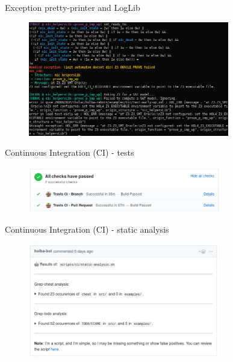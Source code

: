 \documentclass[xcolor={x11names}]{beamer}
\begin{document}
\begin{frame}{Exception pretty-printer and LogLib}
    \begin{figure}
        \centering
        \includegraphics[height=5cm]{../figures/loglib-ppexn-ppterm.png}
    \end{figure}
\end{frame}

\begin{frame}{Continuous Integration (CI) - tests}
    \begin{figure}
        \centering
        \includegraphics[height=2cm]{figures/ci_tests.png}
    \end{figure}
\end{frame}

\begin{frame}{Continuous Integration (CI) - static analysis}
    \begin{figure}
        \centering
        \includegraphics[height=5cm]{figures/ci_static_analysis.png}
    \end{figure}
\end{frame}

\end{document}

